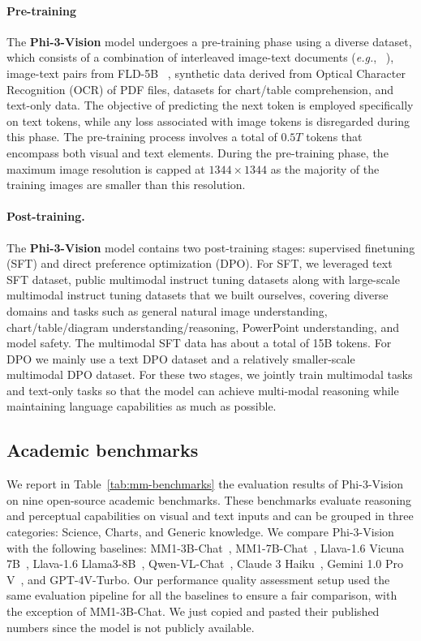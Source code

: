 \documentclass[11pt]{article}
\newcommand{\phivision}{Phi-3-Vision\xspace}
\begin{document}
\paragraph{Pre-training} 

The \textbf{\phivision} model undergoes a pre-training phase using a diverse dataset, which consists of a combination of interleaved image-text documents (\emph{e.g.}, ~\cite{laurenccon2024obelics}), image-text pairs from FLD-5B ~\cite{xiao2023florence}, synthetic data derived from Optical Character Recognition (OCR) of PDF files, datasets for chart/table comprehension, and text-only data. The objective of predicting the next token is employed specifically on text tokens, while any loss associated with image tokens is disregarded during this phase. The pre-training process involves a total of $0.5T$ tokens that encompass both visual and text elements. During the pre-training phase, the maximum image resolution is capped at $1344 \times 1344$ as the majority of the training images are smaller than this resolution.

\paragraph{Post-training.} 

The \textbf{\phivision} model contains two post-training stages: supervised finetuning (SFT) and direct preference optimization (DPO). For SFT, we leveraged text SFT dataset, public multimodal instruct tuning datasets along with large-scale multimodal instruct tuning datasets that we built ourselves, covering diverse domains and tasks such as general natural image understanding, chart/table/diagram understanding/reasoning, PowerPoint understanding, and model safety. The multimodal SFT data has about a total of 15B tokens. For DPO we mainly use a text DPO dataset and a relatively smaller-scale multimodal DPO dataset. For these two stages, we jointly train multimodal tasks and text-only tasks so that the model can achieve multi-modal reasoning while maintaining language capabilities as much as possible. 

\subsection{Academic benchmarks}

We report in Table~\ref{tab:mm-benchmarks} the evaluation results of Phi-3-Vision on nine open-source academic benchmarks. These benchmarks evaluate reasoning and perceptual capabilities on visual and text inputs and can be grouped in three categories: Science, Charts, and Generic knowledge. We compare Phi-3-Vision with the following baselines: MM1-3B-Chat~\cite{mckinzie2024mm1}, MM1-7B-Chat~\cite{mckinzie2024mm1}, Llava-1.6 Vicuna 7B~\cite{liu2023improved}, Llava-1.6 Llama3-8B~\cite{liu2024llavanext}, Qwen-VL-Chat~\cite{bai2023qwenvl}, Claude 3 Haiku~\cite{anthropic2024claude}, Gemini 1.0 Pro V~\cite{team2023gemini}, and GPT-4V-Turbo. Our performance quality assessment setup used the same evaluation pipeline for all the baselines to ensure a fair comparison, with the exception of MM1-3B-Chat. We just copied and pasted their published numbers since the model is not publicly available.
\end{document}
